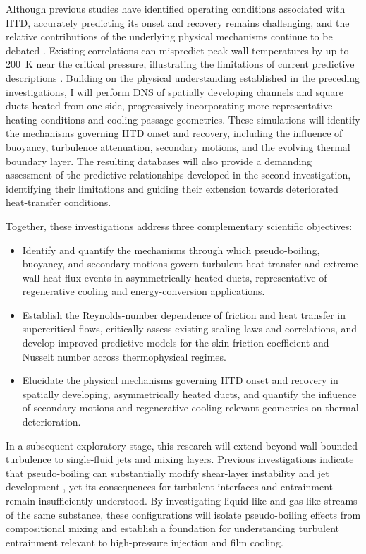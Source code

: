 \documentclass[11pt]{article}
\begin{document}
Although previous studies have identified operating conditions associated with HTD, accurately predicting its onset and recovery remains challenging, and the relative contributions of the underlying physical mechanisms continue to be debated \cite{Nasuti2021,Li2025}.
Existing correlations can mispredict peak wall temperatures by up to 200~K near the critical pressure, illustrating the limitations of current predictive descriptions \cite{Nasuti2021}.
Building on the physical understanding established in the preceding investigations, I will perform DNS of spatially developing channels and square ducts heated from one side, progressively incorporating more representative heating conditions and cooling-passage geometries.
These simulations will identify the mechanisms governing HTD onset and recovery, including the influence of buoyancy, turbulence attenuation, secondary motions, and the evolving thermal boundary layer.
The resulting databases will also provide a demanding assessment of the predictive relationships developed in the second investigation, identifying their limitations and guiding their extension towards deteriorated heat-transfer conditions.

Together, these investigations address three complementary scientific objectives:
\begin{itemize}
	\item[\textbf{O1.}] Identify and quantify the mechanisms through which pseudo-boiling, buoyancy, and secondary motions govern turbulent heat transfer and extreme wall-heat-flux events in asymmetrically heated ducts, representative of regenerative cooling and energy-conversion applications.
	\item[\textbf{O2.}] Establish the Reynolds-number dependence of friction and heat transfer in supercritical flows, critically assess existing scaling laws and correlations, and develop improved predictive models for the skin-friction coefficient and Nusselt number across thermophysical regimes.
	\item[\textbf{O3.}] Elucidate the physical mechanisms governing HTD onset and recovery in spatially developing, asymmetrically heated ducts, and quantify the influence of secondary motions and regenerative-cooling-relevant geometries on thermal deterioration.
\end{itemize}
In a subsequent exploratory stage, this research will extend beyond wall-bounded turbulence to single-fluid jets and mixing layers.
Previous investigations indicate that pseudo-boiling can substantially modify shear-layer instability and jet development \cite{Lapenna2019,SharanBellan2021}, yet its consequences for turbulent interfaces and entrainment remain insufficiently understood.
By investigating liquid-like and gas-like streams of the same substance, these configurations will isolate pseudo-boiling effects from compositional mixing and establish a foundation for understanding turbulent entrainment relevant to high-pressure injection and film cooling.
\end{document}
